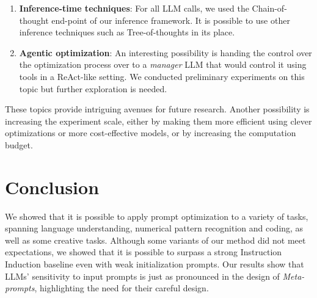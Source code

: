 \begin{enumerate}
    \item \textbf{Inference-time techniques}: For all LLM calls, we used the Chain-of-thought end-point of our inference framework. It is possible to use other inference techniques such as Tree-of-thoughts in its place.
    \item \textbf{Agentic optimization}: An interesting possibility is handing the control over the optimization process over to a \textit{manager} LLM that would control it using tools in a ReAct-like setting. We conducted preliminary experiments on this topic but further exploration is needed. 
\end{enumerate}

These topics provide intriguing avenues for future research. Another possibility is increasing the experiment scale, either by making them more efficient
using clever optimizations or more cost-effective models, or by increasing the computation budget. 

\section{Conclusion}
We showed that it is possible to apply prompt optimization to a variety of tasks, spanning language understanding, numerical pattern recognition and coding, as well as some creative tasks.
Although some variants of our method did not meet expectations, we showed that it is possible to surpass a strong Instruction Induction baseline even with weak initialization prompts. 
Our results show that LLMs' sensitivity to input prompts is just as pronounced in the design of \textit{Meta-prompts}, highlighting the need for their careful design.
